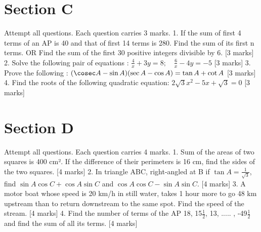 \documentclass{article}%
\begin{document}
%
\section*{Section C}%
\label{sec:SectionC}%
Attempt all questions. Each question carries 3 marks.%
\vspace{0.3cm}%
1. If the sum of first 4 terms of an AP is 40 and that of first 14 terms is 280. Find the sum of its first n terms. OR Find the sum of the first 30 positive integers divisible by 6. [3 marks]%
\vspace{0.4cm}%
2. Solve the following pair of equations : $ \frac { 4 } { x } + 3 y = 8; \quad \frac { 6 } { x } - 4 y = - 5 $ [3 marks]%
\vspace{0.4cm}%
3. Prove the following : $ (\cosec A - \sin A) (\sec A - \cos A) = \tan A + \cot A $ [3 marks]%
\vspace{0.4cm}%
4. Find the roots of the following quadratic equation: $ 2\sqrt{3}x^{2} - 5x + \sqrt{3} = 0 $ [3 marks]%
\vspace{0.4cm}

%
\section*{Section D}%
\label{sec:SectionD}%
Attempt all questions. Each question carries 4 marks.%
\vspace{0.3cm}%
1. Sum of the areas of two squares is 400 cm². If the difference of their perimeters is 16 cm, find the sides of the two squares. [4 marks]%
\vspace{0.4cm}%
2. In triangle ABC, right-angled at B if $ \tan A = \frac { 1 } { \sqrt { 3 } } $, find $ \sin A \cos C + \cos A \sin C $ and $ \cos A \cos C - \sin A \sin C $. [4 marks]%
\vspace{0.4cm}%
3. A motor boat whose speed is 20 km/h in still water, takes 1 hour more to go 48 km upstream than to return downstream to the same spot. Find the speed of the stream. [4 marks]%
\vspace{0.4cm}%
4. Find the number of terms of the AP 18, 15$ \frac{1}{2} $, 13, ..... , -49$ \frac{1}{2} $ and find the sum of all its terms. [4 marks]%
\vspace{0.4cm}

%
\end{document}

